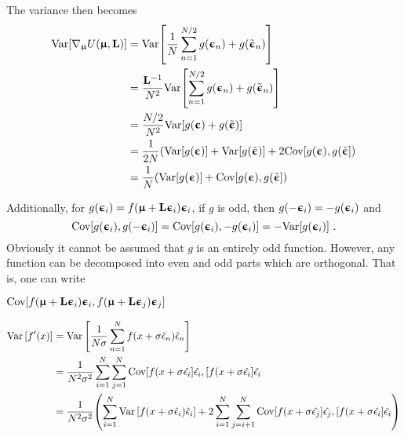 
\iffalse
The variance then becomes
\begin{align}
    \text{Var}{\left[\nabla_{\boldsymbol{\upmu}}U({\boldsymbol{\upmu}},{\mathbf{L}})\right]}
    &= \text{Var}{\left[\frac{1}{N}\sum_{n=1}^{N/2} g({\boldsymbol{\upepsilon}}_n) + g(\tilde{{\boldsymbol{\upepsilon}}}_n)\right]}\nonumber\\
    &= \frac{{\mathbf{L}}^{-1}}{N^2}\text{Var}{\left[\sum_{n=1}^{N/2} g({\boldsymbol{\upepsilon}}_n) + g(\tilde{{\boldsymbol{\upepsilon}}}_n)\right]}\nonumber\\
    &= \frac{N/2}{N^2}\text{Var}{\left[g({\boldsymbol{\upepsilon}}) + g(\tilde{{\boldsymbol{\upepsilon}}})\right]}\nonumber\\
    &= \frac{1}{2N}{\left(\text{Var}{\left[g({\boldsymbol{\upepsilon}})\right]} + \text{Var}{\left[g(\tilde{{\boldsymbol{\upepsilon}}})\right]} + 2\text{Cov}{\left[g({\boldsymbol{\upepsilon}}),g(\tilde{{\boldsymbol{\upepsilon}}}\right]}\right)}\nonumber\\
    &= \frac{1}{N}{\left(\text{Var}{\left[g({\boldsymbol{\upepsilon}})\right]} + 
    \text{Cov}{\left[g({\boldsymbol{\upepsilon}}),g(\tilde{{\boldsymbol{\upepsilon}}}\right]}\right)}\nonumber
\end{align}


Additionally, for $g({\boldsymbol{\upepsilon}}_i) = f({\boldsymbol{\upmu}}+{\mathbf{L}}{\boldsymbol{\upepsilon}}_i){\boldsymbol{\upepsilon}}_i$, if $g$ is odd, then $g(-{\boldsymbol{\upepsilon}}_i)=-g({\boldsymbol{\upepsilon}}_i)$ and
\begin{equation}
    \text{Cov}{\left[g({\boldsymbol{\upepsilon}}_i),g(-{\boldsymbol{\upepsilon}}_i)\right]} = \text{Cov}{\left[g({\boldsymbol{\upepsilon}}_i),-g({\boldsymbol{\upepsilon}}_i)\right]} = -\text{Var}{\left[g({\boldsymbol{\upepsilon}}_i)\right]} \ .
\end{equation}
Obviously it cannot be assumed that $g$ is an entirely odd function. However, any function can be decomposed into even and odd parts which are orthogonal. That is, one can write

$\text{Cov}{\left[f({\boldsymbol{\upmu}}+{\mathbf{L}}{\boldsymbol{\upepsilon}}_i){\boldsymbol{\upepsilon}}_i, f({\boldsymbol{\upmu}}+{\mathbf{L}}{\boldsymbol{\upepsilon}}_j){\boldsymbol{\upepsilon}}_j\right]}$


\begin{align} %
    \text{Var}\left[f'(x)\right]
    &= \text{Var}\left[\frac{1}{N\sigma}\sum_{n=1}^N f(x+\sigma\hat{\epsilon}_n)\hat{\epsilon}_n\right]\nonumber\\
    &= \frac{1}{N^2\sigma^2}\sum_{i=1}^N\sum_{j=1}^N\text{Cov}\bra{f(x+\sigma\hat{\epsilon_i}}\hat{\epsilon_i}, \bra{f(x+\sigma\hat{\epsilon_i}}\hat{\epsilon_i}\\
    &= \frac{1}{N^2\sigma^2}\pa{\sum_{i=1}^N \text{Var}\left[f(x+\sigma\hat{\epsilon}_i)\hat{\epsilon}_i\right] + 2\sum_{i=1}^N\sum_{j=i+1}^N\text{Cov}\bra{f(x+\sigma\hat{\epsilon_j}}\hat{\epsilon_j}, \bra{f(x+\sigma\hat{\epsilon_i}}\hat{\epsilon_i}}
\end{align}


